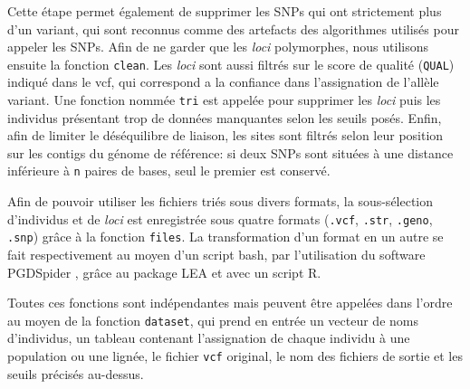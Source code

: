 \documentclass[../Master_report2.tex]{subfiles}
\begin{document}
Cette étape permet également de supprimer les SNPs qui ont strictement plus d'un variant, qui sont reconnus comme des artefacts des algorithmes utilisés pour appeler les SNPs.
Afin de ne garder que les \textit{loci} polymorphes, nous utilisons ensuite la fonction \verb|clean|. Les \textit{loci} sont aussi filtrés sur le score de qualité (\verb|QUAL|) indiqué dans le vcf, qui correspond a la confiance dans l'assignation de l'allèle variant.
 Une fonction nommée \verb|tri| est appelée pour supprimer les \textit{loci} puis les individus présentant trop de données manquantes selon les seuils posés. Enfin, afin de limiter le déséquilibre de liaison, les sites sont filtrés selon leur position sur les contigs du génome de référence: si deux SNPs sont situées à une distance inférieure à \verb|n| paires de bases, seul le premier est conservé.

Afin de pouvoir utiliser les fichiers triés sous divers formats, la sous-sélection d'individus et de \textit{loci} est enregistrée sous quatre formats (\verb|.vcf|, \verb|.str|, \verb|.geno|, \verb|.snp|) grâce à la fonction \verb|files|.
 La transformation d'un format en un autre se fait respectivement au moyen d'un script bash, par l'utilisation du software PGDSpider \citep{Lischer2012}, grâce au package LEA \citep{Frichot2015} et avec un script R.

Toutes ces fonctions sont indépendantes mais peuvent être appelées dans l'ordre au moyen de la fonction \verb|dataset|, qui prend en entrée un vecteur de noms d'individus, un tableau contenant l'assignation de chaque individu à une population ou une lignée, le fichier \verb|vcf| original, le nom des fichiers de sortie et les seuils précisés au-dessus.
\end{document}
